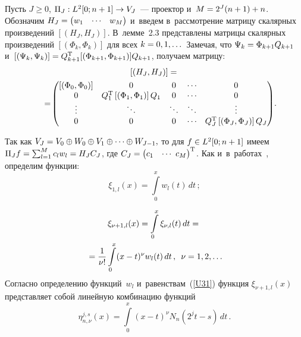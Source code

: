 \begin{multicols}{2}
Пусть $J\geqslant 0$,  $\Pi_{J} : {L}^2[0;n+1]\hm\to V_{J}$~--- 
проектор и~$M\hm=2^{J}(n+1)+n$. Обозначим ${H}_J\hm=
\begin{pmatrix}w_1 & \cdots & w_M
\end{pmatrix}$ и~введем в~рассмотрение матрицу скалярных 
произведений $[({H}_J, {H}_J)]$. 
В~лемме~2.3 представлены матрицы скалярных произведений 
$[(\Phi_k, \Phi_k)]$ для всех $k\hm=0,1,\dots$ Замечая, что $\Psi_k \hm= 
\Phi_{k+1}{Q}_{k+1}$ и~$[(\Psi_k,\Psi_k)]\hm={Q}_{k+1}^{\mathrm{T}}
[( \Phi_{k+1}, \Phi_{k+1})]{Q}_{k+1}$,
получаем матрицу:
{\small \begin{multline*}
\left[({H}_J, {H}_J)\right]={}\\
\!{}=\!
\begin{pmatrix}
\left[(\Phi_0, \Phi_0)\right] & 0 & 0 & \cdots & 0\\
0 & {Q}_{1}^{\mathrm{T}}\left[( \Phi_{1}, \Phi_{1})\right]{Q}_{1} & 0 & \cdots & 0 \\
\vdots & \ddots & \ddots & \ddots & \vdots \\
0 & 0 & 0 & \cdots & {Q}_{J}^{\mathrm{T}}\left[( \Phi_{J}, \Phi_{J})\right]{Q}_{J}
\end{pmatrix}\!.\hspace*{-12.6139pt}
\end{multline*}
}

\noindent
Так как $V_{J}\hm=V_0\oplus W_0\oplus V_1\oplus\dots\oplus W_{J-1},$ то для 
$f\hm\in {L}^2[0;n+1]$ имеем
$\Pi_{J} f\hm=\sum\nolimits_{l=1}^{M} c_l w_l \hm= {H}_{J}{C}_{J}$,
где ${C}_J\hm=
\begin{pmatrix} c_1 & \cdots\ c_{M} \end{pmatrix}^{\mathrm{T}}$.
Как и~в~работах~\cite{Lepik1, Lepik2, Lepik3, Lepik4, Lepik}, определим функции:
\begin{equation}
\label{U38}
{\xi}_{1,l}(x)=\int\limits_0^x w_l (t)\,dt\,;
\end{equation}


\noindent
\begin{multline}
\label{U38-1}
{\xi}_{\nu+1,l}(x)=\int\limits_0^x {\xi}_{\nu,l}(t)\,dt={}\\
{}=
\displaystyle\frac{\displaystyle 1\mathstrut}{\displaystyle \nu !\mathstrut}\int\limits_0^x (x-t)^{\nu} w_l (t)\,dt\,,
\enskip \nu = 1,2,\ldots
\end{multline}
Согласно определению функций~$w_l$ и~равенст\-вам~(\ref{U31})  
функция ${\xi}_{\nu+1,l}(x)$ представляет собой линейную комбинацию функций
$$
\eta_{n,\nu}^{j,s}(x)=\int\limits_0^x (x-t)^{\nu} N_{n}(2^j t-s)\,dt\,.
$$


\end{multicols}

